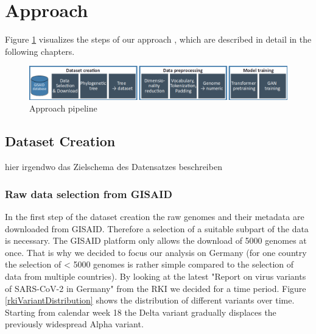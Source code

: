 \section{Approach} 
\label{approach}

Figure \ref{pipeline} visualizes the steps of our approach , which are described in detail in the following chapters.

\begin{figure}[ht]
	\centering
	\includegraphics[width=1.0\linewidth]{figures/pipeline.png}
	\caption{Approach pipeline \cite{own representation}}
	\label{pipeline}
\end{figure}


\subsection{Dataset Creation}  \label{ch:approachA}

hier irgendwo das Zielschema des Datensatzes beschreiben


\subsubsection{Raw data selection from \ac{GISAID}}
\label{ch:approachAa}

In the first step of the dataset creation the raw genomes and their metadata are downloaded from \ac{GISAID}. Therefore a selection of a suitable subpart of the data is necessary. The \ac{GISAID} platform only allows the download of 5000 genomes at once. That is why we decided to focus our analysis on Germany (for one country the selection of < 5000 genomes is rather simple compared to the selection of data from multiple countries). By looking at the latest "Report on virus variants of SARS-CoV-2 in Germany" from the \ac{RKI} we decided for a time period. Figure \ref{rkiVariantDistribution} shows the distribution of different variants over time. Starting from calendar week 18 the Delta variant gradually displaces the previously widespread Alpha variant.

